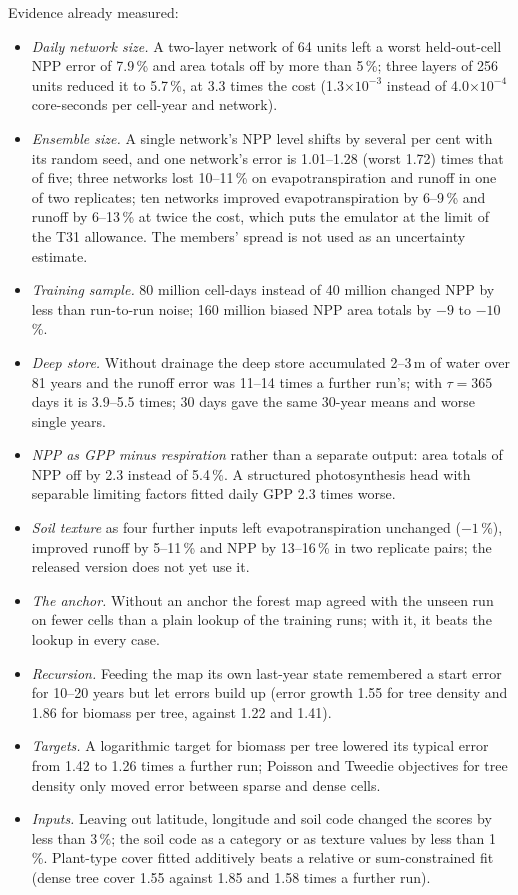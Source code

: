 \documentclass[11pt,a4paper]{article}
\begin{document}
Evidence already measured:
\begin{itemize}
  \item \emph{Daily network size.} A two-layer network of 64 units left a worst held-out-cell NPP error of 7.9\,\% and
        area totals off by more than 5\,\%; three layers of 256 units reduced it to 5.7\,\%, at 3.3 times the cost
        (1.3$\times10^{-3}$ instead of 4.0$\times10^{-4}$ core-seconds per cell-year and network).
  \item \emph{Ensemble size.} A single network's NPP level shifts by several per cent with its random seed, and one
        network's error is 1.01--1.28 (worst 1.72) times that of five; three networks lost 10--11\,\% on
        evapotranspiration and runoff in one of two replicates; ten networks improved evapotranspiration by 6--9\,\%
        and runoff by 6--13\,\% at twice the cost, which puts the emulator at the limit of the T31 allowance. The
        members' spread is not used as an uncertainty estimate.
  \item \emph{Training sample.} 80 million cell-days instead of 40 million changed NPP by less than run-to-run noise;
        160 million biased NPP area totals by $-9$ to $-10$\,\%.
  \item \emph{Deep store.} Without drainage the deep store accumulated 2--3\,m of water over 81 years and the runoff
        error was 11--14 times a further run's; with $\tau=365$\,days it is 3.9--5.5 times; 30 days gave the same
        30-year means and worse single years.
  \item \emph{NPP as GPP minus respiration} rather than a separate output: area totals of NPP off by 2.3 instead of
        5.4\,\%. A structured photosynthesis head with separable limiting factors fitted daily GPP 2.3 times worse.
  \item \emph{Soil texture} as four further inputs left evapotranspiration unchanged ($-1$\,\%), improved runoff by
        5--11\,\% and NPP by 13--16\,\% in two replicate pairs; the released version does not yet use it.
  \item \emph{The anchor.} Without an anchor the forest map agreed with the unseen run on fewer cells than a plain
        lookup of the training runs; with it, it beats the lookup in every case.
  \item \emph{Recursion.} Feeding the map its own last-year state remembered a start error for 10--20 years but let
        errors build up (error growth 1.55 for tree density and 1.86 for biomass per tree, against 1.22 and 1.41).
  \item \emph{Targets.} A logarithmic target for biomass per tree lowered its typical error from 1.42 to 1.26 times a
        further run; Poisson and Tweedie objectives for tree density only moved error between sparse and dense cells.
  \item \emph{Inputs.} Leaving out latitude, longitude and soil code changed the scores by less than 3\,\%; the soil
        code as a category or as texture values by less than 1\,\%. Plant-type cover fitted additively beats a
        relative or sum-constrained fit (dense tree cover 1.55 against 1.85 and 1.58 times a further run).
\end{itemize}
\end{document}
